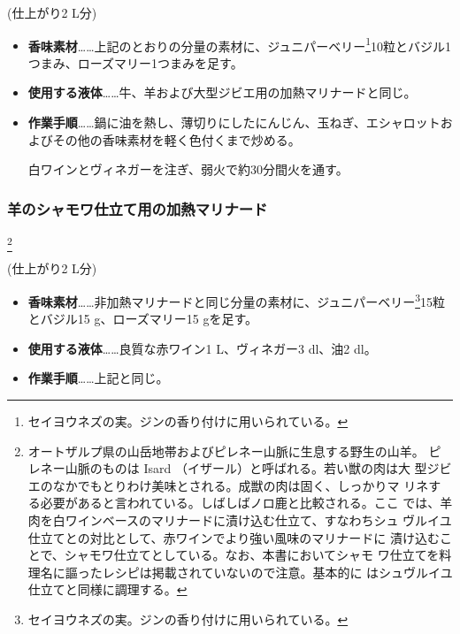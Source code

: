 \begin{recette}
(仕上がり2 L分)

\begin{itemize}
\item
  \textbf{香味素材}\ldots{}\ldots{}上記のとおりの分量の素材に、ジュニパーベリー\footnote{セイヨウネズの実。ジンの香り付けに用いられている。}10粒とバジル1つまみ、ローズマリー1つまみを足す。
\item
  \textbf{使用する液体}\ldots{}\ldots{}牛、羊および大型ジビエ用の加熱マリナードと同じ。
\item
  \textbf{作業手順}\ldots{}\ldots{}鍋に油を熱し、薄切りにしたにんじん、玉ねぎ、エシャロットおよびその他の香味素材を軽く色付くまで炒める。

  白ワインとヴィネガーを注ぎ、弱火で約30分間火を通す。
\end{itemize}

\maeaki

\hypertarget{marinade-cuite-pour-le-mouton-en-chamois}{%
\subsubsection{羊のシャモワ仕立て用の加熱マリナード}\label{marinade-cuite-pour-le-mouton-en-chamois}}

\footnote{オートザルプ県の山岳地帯およびピレネー山脈に生息する野生の山羊。
  ピレネー山脈のものは Isard （イザール）と呼ばれる。若い獣の肉は大
  型ジビエのなかでもとりわけ美味とされる。成獣の肉は固く、しっかりマ
  リネする必要があると言われている。しばしばノロ鹿と比較される。ここ
  では、羊肉を白ワインベースのマリナードに漬け込む仕立て、すなわちシュ
  ヴルイユ仕立てとの対比として、赤ワインでより強い風味のマリナードに
  漬け込むことで、シャモワ仕立てとしている。なお、本書においてシャモ
  ワ仕立てを料理名に謳ったレシピは掲載されていないので注意。基本的に
  はシュヴルイユ仕立てと同様に調理する。}


(仕上がり2 L分)

\begin{itemize}
\item
  \textbf{香味素材}\ldots{}\ldots{}非加熱マリナードと同じ分量の素材に、ジュニパーベリー\footnote{セイヨウネズの実。ジンの香り付けに用いられている。}15粒とバジル15
  g、ローズマリー15 gを足す。
\item
  \textbf{使用する液体}\ldots{}\ldots{}良質な赤ワイン1\undemi{}
  L、ヴィネガー3 dl、油2\undemi{} dl。
\item
  \textbf{作業手順}\ldots{}\ldots{}上記と同じ。


\end{itemize}
\end{recette}
